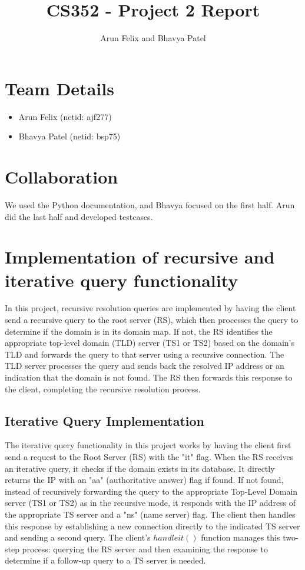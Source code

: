 \documentclass{article}
\begin{document}
\title{CS352 - Project 2 Report}
\author{Arun Felix and Bhavya Patel}
\maketitle

\section{Team Details}

\begin{itemize}
    \item Arun Felix (netid: ajf277)
    \item Bhavya Patel (netid: bsp75)
\end{itemize}

\section{Collaboration}

We used the Python documentation, and Bhavya focused on the first half. Arun did the last half and developed testcases.

\section{Implementation of recursive and iterative query functionality}

In this project, recursive resolution queries are implemented by having the client send a recursive query to the root server (RS), which then processes the query to determine if the domain is in its domain map. 
If not, the RS identifies the appropriate top-level domain (TLD) server (TS1 or TS2) based on the domain's TLD and forwards the query to that server using a recursive connection. 
The TLD server processes the query and sends back the resolved IP address or an indication that the domain is not found. 
The RS then forwards this response to the client, completing the recursive resolution process.

\subsection{Iterative Query Implementation}

The iterative query functionality in this project works by having the client first send a request to the Root Server (RS) with the "it" flag. When the RS receives an iterative query, it checks if the domain exists in its database. 
It directly returns the IP with an "aa" (authoritative answer) flag if found. 
If not found, instead of recursively forwarding the query to the appropriate Top-Level Domain server (TS1 or TS2) as in the recursive mode, it responds with the IP address of the appropriate TS server and a "ns" (name server) flag. 
The client then handles this response by establishing a new connection directly to the indicated TS server and sending a second query. The client's $handleit()$ function manages this two-step process: querying the RS server and then examining the response to determine if a follow-up query to a TS server is needed. 
\end{document}
